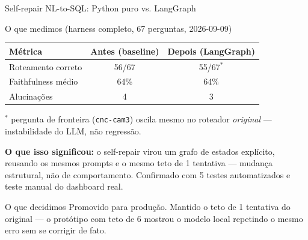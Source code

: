 \documentclass{beamer}
\newenvironment{numerobloco}[1]{\begin{block}{#1}}{\end{block}}
\newenvironment{decisaobloco}[1]{\begin{alertblock}{#1}}{\end{alertblock}}
\begin{document}
\begin{frame}{Self-repair NL-to-SQL: Python puro vs. LangGraph}
  \small
  \begin{numerobloco}{O que medimos (harness completo, 67 perguntas, 2026-09-09)}
    \begin{center}
    \begin{tabular}{lcc}
      \toprule
      \textbf{Métrica} & \textbf{Antes (baseline)} & \textbf{Depois (LangGraph)} \\
      \midrule
      Roteamento correto & 56/67  & 55/67$^*$ \\
      Faithfulness médio & 64\%   & 64\%   \\
      Alucinações         & 4      & 3      \\
      \bottomrule
    \end{tabular}
    \end{center}
    \footnotesize $^*$ pergunta de fronteira (\texttt{cnc-cam3}) oscila mesmo no roteador
    \emph{original} — instabilidade do LLM, não regressão.
  \end{numerobloco}

  \pause
  \textbf{O que isso significou:} o self-repair virou um grafo de estados explícito,
  reusando os mesmos prompts e o mesmo teto de 1 tentativa — mudança estrutural, não de
  comportamento. Confirmado com 5 testes automatizados e teste manual do dashboard real.

  \pause
  \begin{decisaobloco}{O que decidimos}
    Promovido para produção. Mantido o teto de 1 tentativa do original — o protótipo com
    teto de 6 mostrou o modelo local repetindo o mesmo erro sem se corrigir de fato.
  \end{decisaobloco}
\end{frame}
\end{document}
